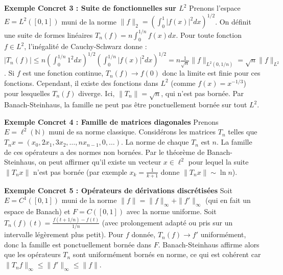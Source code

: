 \documentclass[11pt,a4paper]{article}
\begin{document}
\textbf{Exemple Concret 3 : Suite de fonctionnelles sur $L^2$}
Prenons l'espace $E = L^2([0, 1])$ muni de la norme $\|f\|_2 = (\int_0^1 |f(x)|^2 dx)^{1/2}$.
On définit une suite de formes linéaires $T_n(f) = n \int_0^{1/n} f(x) dx$.
Pour toute fonction $f \in L^2$, l'inégalité de Cauchy-Schwarz donne :
$|T_n(f)| \le n (\int_0^{1/n} 1^2 dx)^{1/2} (\int_0^{1/n} |f(x)|^2 dx)^{1/2} = n \frac{1}{\sqrt{n}} \|f\|_{L^2(0, 1/n)} = \sqrt{n} \|f\|_{L^2}$.
Si $f$ est une fonction continue, $T_n(f) \to f(0)$ donc la limite est finie pour ces fonctions. Cependant, il existe des fonctions dans $L^2$ (comme $f(x) = x^{-1/3}$) pour lesquelles $T_n(f)$ diverge.
Ici, $\|T_n\| = \sqrt{n}$, qui n'est pas bornée. Par Banach-Steinhaus, la famille ne peut pas être ponctuellement bornée sur tout $L^2$.

\textbf{Exemple Concret 4 : Famille de matrices diagonales}
Prenons $E = \ell^2(\mathbb{N})$ muni de sa norme classique.
Considérons les matrices $T_n$ telles que $T_n x = (x_0, 2x_1, 3x_2, \dots, n x_{n-1}, 0, \dots)$.
La norme de chaque $T_n$ est $n$. La famille de ces opérateurs a des normes non bornées.
Par le théorème de Banach-Steinhaus, on peut affirmer qu'il existe un vecteur $x \in \ell^2$ pour lequel la suite $\|T_n x\|$ n'est pas bornée (par exemple $x_k = \frac{1}{k+1}$ donne $\|T_n x\| \sim \ln n$).

\textbf{Exemple Concret 5 : Opérateurs de dérivations discrétisées}
Soit $E = C^1([0, 1])$ muni de la norme $\|f\| = \|f\|_\infty + \|f'\|_\infty$ (qui en fait un espace de Banach) et $F = C([0, 1])$ avec la norme uniforme.
Soit $T_n(f)(t) = \frac{f(t+1/n) - f(t)}{1/n}$ (avec prolongement adapté ou pris sur un intervalle légèrement plus petit).
Pour $f$ donnée, $T_n(f) \to f'$ uniformément, donc la famille est ponctuellement bornée dans $F$.
Banach-Steinhaus affirme alors que les opérateurs $T_n$ sont uniformément bornés en norme, ce qui est cohérent car $\|T_n f\|_\infty \le \|f'\|_\infty \le \|f\|$.

\end{document}
